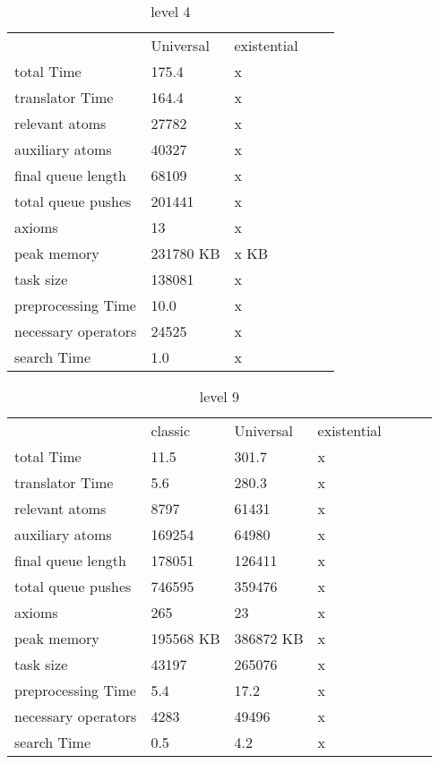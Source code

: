 			
			\begin{table}[h]
				\centering
				\caption{level 4}
				\label{lvl4}
				\begin{tabular}{lllll}
					& Universal & existential  \\
					total Time& 175.4 & x \\
					translator Time& 164.4 &x  \\
					
					
					relevant atoms & 27782 & x\\
					auxiliary atoms & 40327 &x \\
					final queue length & 68109 &x \\
					total queue pushes & 201441 &x \\
					axioms & 13 & x \\ 
					peak memory & 231780 KB &x  KB\\ 
					task size & 138081 &x \\
					
					preprocessing Time& 10.0 &  x\\
					necessary operators & 24525 & x\\
					
					search Time & 1.0 &x  \\
				\end{tabular}
			\end{table}
			

						\begin{table}[h]
							\centering
							\caption{level 9}
							\label{lvl9}
							\begin{tabular}{lllllll}
								& classic  & Universal & existential\\
								total Time& 11.5 & 301.7 &x \\
								translator Time& 5.6& 280.3 & x\\
								
								
								relevant atoms & 8797& 61431 &x \\
								auxiliary atoms & 169254 & 64980 &x \\
								final queue length & 178051& 126411 &x \\
								total queue pushes & 746595& 359476 &x \\
								axioms &  265& 23 &x \\ 
								peak memory & 195568 KB& 386872 KB &x \\ 
								task size & 43197& 265076 &x \\
								
								
								preprocessing Time& 5.4 & 17.2 &x \\
								necessary operators & 4283 & 49496 &x \\
								
								
								search Time & 0.5 & 4.2 &x \\
							\end{tabular}
						\end{table}
			
